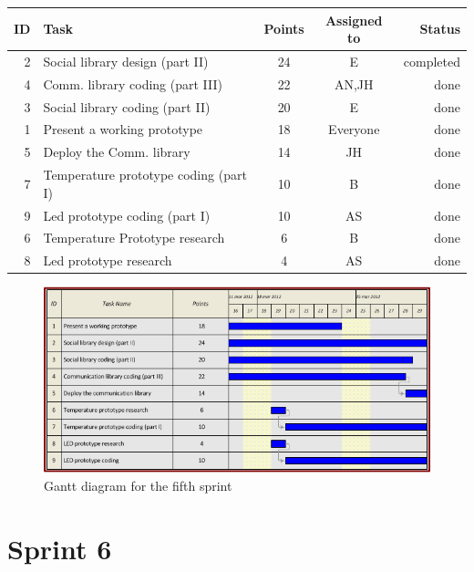 \begin{table}[ht!]
\begin{tabular}{ | r | l | c |c | r | }

\hline
\textbf{ID} & \textbf{Task} & \textbf{Points} & \textbf{Assigned to} & \textbf{Status} \\
\hline

 2 & Social library design (part II)			& 24 & E 		& completed \\
\hline
 4 & Comm. library coding (part III)	& 22 & AN,JH	& done \\
\hline
 3 & Social library coding (part II)			& 20 & E		& done \\
\hline
 1 & Present a working prototype				& 18 & Everyone	& done \\
\hline
 5 & Deploy the Comm. library					& 14 & JH		& done \\
\hline
 7 & Temperature prototype coding (part I)		& 10 & B 		& done \\
\hline
 9 & Led prototype coding (part I)				& 10 & AS 		& done \\
\hline
 6 & Temperature Prototype research				& 6  & B 		& done \\
\hline
 8 & Led prototype research						& 4  & AS 		& done \\
\hline


\end{tabular}
\end{table}


\begin{figure}[h!]
\centering \includegraphics[scale=0.8]{img/sprints-gantt5.png}
\caption{Gantt diagram for the fifth sprint}
\label{fig:sprints-gantt5}
\end{figure}


\newpage

\section{Sprint 6}

